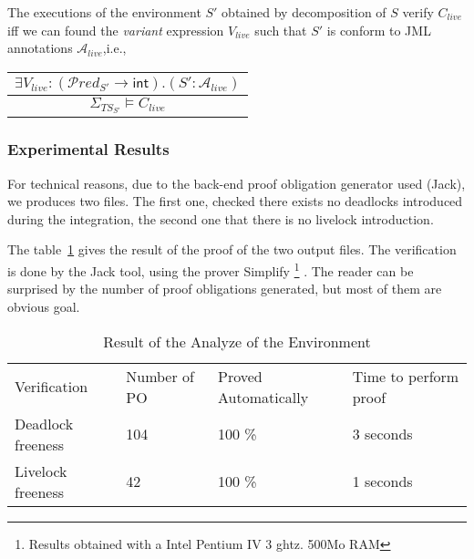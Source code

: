 \begin{proposition}
\label{prop-livelock2}
The executions of the environment $S'$ obtained by decomposition of $S$ 
verify $C_{live}$ iff we can found the \textit{variant} expression $V_{live}$
such that $S'$ is conform to JML annotations $\mathcal{A}_{live}$,i.e.,
\begin{center}
\begin{tabular}{c}
$\exists V_{live} : (\mathcal{P}red_{S'} \rightarrow \mathsf{int}) . (S': \mathcal{A}_{live})$\\
\hline
$\Sigma_{TS_{S'}} \models C_{live} $
\end{tabular}
\end{center}

\end{proposition}





\subsubsection{Experimental Results}

For technical reasons, due to the back-end proof obligation 
generator used (Jack), we produces two files. The first one, 
checked there exists no deadlocks introduced during the integration,
the second one that there is no livelock introduction. 


The table~\ref{table-refinement} gives the result of the proof
of the two output files. The verification is done by the 
Jack tool, using the prover Simplify
\footnote{Results obtained with a Intel Pentium IV 3 ghtz. 500Mo RAM} . The reader can be surprised by
the number of proof obligations generated, but most of them are obvious goal. 
\begin{table}
\label{table-refinement}
\begin{tabular}{|l|l|l|l|}
\hline
Verification & Number of PO & Proved Automatically & Time to perform proof \\
Deadlock freeness & 104 & 100 \% & 3 seconds \\
Livelock freeness & 42 & 100 \% & 1 seconds \\
\hline
\end{tabular}
\caption{Result of the Analyze of the Environment}
\end{table}




